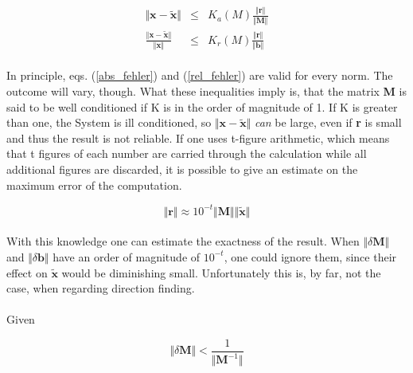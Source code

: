 \documentclass[a4paper,10pt]{thesis}
\begin{document}
\begin{eqnarray}\label{M}
\Vert \textbf{x} - \tilde{\textbf{x}}\Vert &\leq& K_a(M) \frac{\Vert \textbf{r} \Vert}{\Vert \textbf{M} \Vert}\label{abs_fehler}\\
\frac{\Vert \textbf{x} - \tilde{\textbf{x}}\Vert}{\Vert \textbf{x} \Vert} &\leq& K_r(M) \frac{\Vert \textbf{r} \Vert}{\Vert \textbf{b} \Vert} \label{rel_fehler}
\end{eqnarray}

\paragraph*{}
In principle, eqs. (\ref{abs_fehler}) and (\ref{rel_fehler}) are valid for every norm. The outcome will vary, though. What these inequalities imply is, that the matrix \textbf{M} is said to be well conditioned if K is in the order of magnitude of 1. If K is greater than one, the System is ill conditioned, so $\Vert \textbf{x} - \tilde{\textbf{x}}\Vert$ \emph{can} be large, even if \textbf{r} is small and thus the result is not reliable. If one uses t-figure arithmetic, which means that t figures of each number are carried through the calculation while all additional figures are discarded, it is possible to give an estimate on the maximum error of the computation.

\begin{equation}
\Vert \textbf{r} \Vert \approx 10^{-t}
\Vert \textbf{M} \Vert \Vert \tilde{\textbf{x}} \Vert
\end{equation}

\paragraph*{}
With this knowledge one can estimate the exactness of the result. When $\Vert \delta \textbf{M} \Vert$ and $\Vert \delta \textbf{b} \Vert$ have an order of magnitude of $10^{-t}$, one could ignore them, since their effect on $\tilde{\textbf{x}}$ would be diminishing small. Unfortunately this is, by far, not the case, when regarding direction finding.

\paragraph*{}
Given

\begin{equation}
\Vert \delta \textbf{M} \Vert < \frac{1}{\Vert \textbf{M}^{-1} \Vert }
\end{equation}
\end{document}
